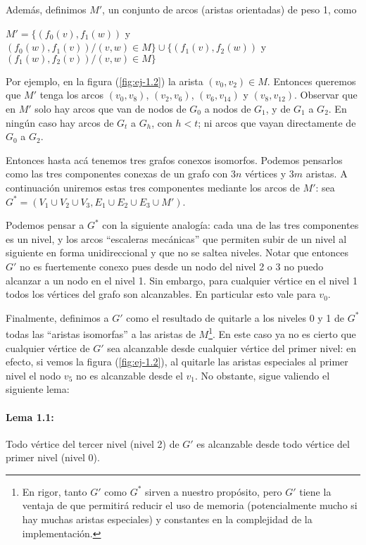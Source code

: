 Además, definimos $M'$, un conjunto de arcos (aristas orientadas) de peso 1, como 

{\footnotesize$M'= \{(f_0(v), f_1(w))$ y $(f_0(w), f_1(v)) / (v,w)\in M\} \cup \{(f_1(v), f_2(w)) $ y $(f_1(w), f_2(v))/ (v,w)\in M\}$}

Por ejemplo, en la figura (\ref{fig:ej-1.2}) la arista $(v_0, v_2)\in M$. Entonces queremos que $M'$ tenga los arcos $(v_0, v_8)$, $(v_2, v_6)$, $(v_6, v_{14})$ y $(v_8, v_{12})$.
Observar que en $M'$ solo hay arcos que van de nodos de $G_0$ a nodos de $G_1$, y de $G_1$ a $G_2$. En ningún caso hay arcos de $G_t$ a $G_h$, con $h<t$; ni arcos que vayan directamente de $G_0$ a $G_2$.

Entonces hasta acá tenemos tres grafos conexos isomorfos. Podemos pensarlos como las tres componentes conexas de un grafo con $3n$ vértices y $3m$ aristas. A continuación uniremos estas tres componentes mediante los arcos de $M'$: sea $G^*=(V_1\cup V_2\cup V_3, E_1\cup E_2\cup E_3 \cup M')$. 

Podemos pensar a $G^*$ con la siguiente analogía: cada una de las tres componentes es un nivel, y los arcos ``escaleras mecánicas'' que permiten subir de un nivel al siguiente en forma unidireccional y que no se saltea niveles. Notar que entonces $G'$ no es fuertemente conexo pues desde un nodo del nivel 2 o 3 no puedo alcanzar a un nodo en el nivel 1. Sin embargo, para cualquier vértice en el nivel 1 todos los vértices del grafo son alcanzables. En particular esto vale para $v_0$.  

Finalmente, definimos a $G'$ como el resultado de quitarle a los niveles 0 y 1 de $G^*$ todas las ``aristas isomorfas'' a las aristas de $M$\footnote{En rigor, tanto $G'$ como $G^*$ sirven a nuestro propósito, pero $G'$ tiene la ventaja de que permitirá reducir el uso de memoria (potencialmente mucho si hay muchas aristas especiales) y constantes en la complejidad de la implementación.}. En este caso ya no es cierto que cualquier vértice de $G'$ sea alcanzable desde cualquier vértice del primer nivel: en efecto, si vemos la figura (\ref{fig:ej-1.2}), al quitarle las aristas especiales al primer nivel el nodo $v_5$ no es alcanzable desde el $v_1$. No obstante, sigue valiendo el siguiente lema:

\paragraph*{Lema 1.1: }Todo vértice del tercer nivel (nivel 2) de $G'$ es alcanzable desde todo vértice del primer nivel (nivel 0). 

